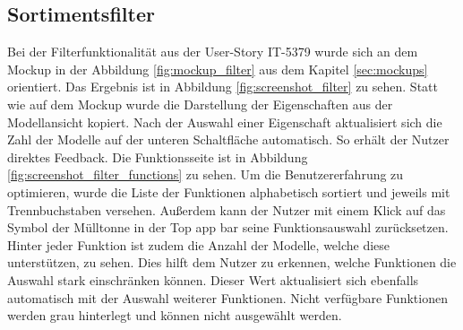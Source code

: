 \FloatBarrier
\subsection{Sortimentsfilter}


Bei der Filterfunktionalität aus der User-Story IT-5379 wurde sich an dem Mockup in der Abbildung \ref{fig:mockup_filter} aus dem Kapitel \ref{sec:mockups} orientiert. Das Ergebnis ist in Abbildung \ref{fig:screenshot_filter} zu sehen. Statt wie auf dem Mockup wurde die Darstellung der Eigenschaften aus der Modellansicht kopiert. Nach der Auswahl einer Eigenschaft aktualisiert sich die Zahl der Modelle auf der unteren Schaltfläche automatisch. So erhält der Nutzer direktes Feedback. Die Funktionsseite ist in Abbildung \ref{fig:screenshot_filter_functions} zu sehen. Um die Benutzererfahrung zu optimieren, wurde die Liste der Funktionen alphabetisch sortiert und jeweils mit Trennbuchstaben versehen. Außerdem kann der Nutzer mit einem Klick auf das Symbol der Mülltonne in der Top app bar seine Funktionsauswahl zurücksetzen. Hinter jeder Funktion ist zudem die Anzahl der Modelle, welche diese unterstützen, zu sehen. Dies hilft dem Nutzer zu erkennen, welche Funktionen die Auswahl stark einschränken können. Dieser Wert aktualisiert sich ebenfalls automatisch mit der Auswahl weiterer Funktionen. Nicht verfügbare Funktionen werden grau hinterlegt und können nicht ausgewählt werden.

